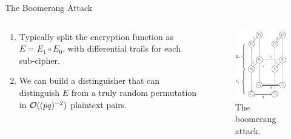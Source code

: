 \documentclass[notheorems]{beamer}
\theoremstyle{definition}
\theoremstyle{example}
\begin{document}
    \begin{frame}{The Boomerang Attack}
        \begin{columns}
            \begin{column}{0.7\textwidth}
                \begin{enumerate}
                    \item<1-> Typically split the encryption function as 
                    \(E = E_1 \circ E_0\), with differential trails for each 
                    sub-cipher.
                    \item<2-> We can build a distinguisher that can distinguish
                    \(E\) from a truly random permutation in 
                    \(\mathcal O((pq)^{-2})\) plaintext pairs.
                \end{enumerate}
            \end{column}
            \begin{column}{0.3\textwidth}
                \begin{figure}[!ht]
                    \centering
                    \includegraphics[width=\columnwidth]{images/boomerang.png}
                    \caption{The boomerang attack.}
                    \label{fig:boomerang}
                \end{figure}
            \end{column}
        \end{columns}
    \end{frame}
\end{document}
